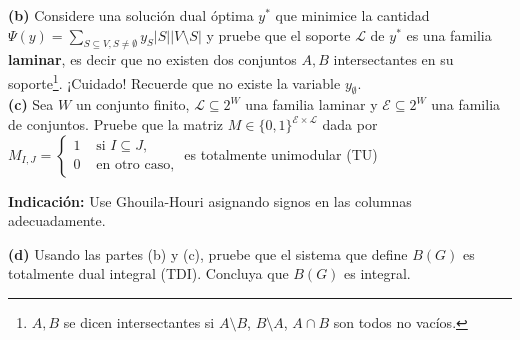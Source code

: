 \documentclass[10pt]{article}
\theoremstyle{plain}
\theoremstyle{definition}
\begin{document}
\hspace{-15pt}\textbf{(b)} Considere una solución dual óptima $y^*$ que minimice la cantidad $\Psi(y)=\sum_{S\subseteq V, S\neq \emptyset} y_S |S||V\setminus S|$
y pruebe que el soporte $\mathcal{L}$ de $y^*$ es una familia \textbf{laminar}, es decir que no existen dos conjuntos $A, B$ intersectantes en su soporte\footnote{$A, B$ se dicen intersectantes si $A\setminus B$, $B\setminus A$, $A\cap B$ son todos no vacíos.}. ¡Cuidado! Recuerde que no existe la variable $y_\emptyset$.\\

\hspace{-15pt}\textbf{(c)} Sea $W$ un conjunto finito, $\mathcal{L}\subseteq 2^W$ una familia laminar y $\mathcal{E}\subseteq 2^W$ una familia de conjuntos. Pruebe que la matriz $M\in \{0,1\}^{\mathcal{E}\times \mathcal{L}}$ dada por
$M_{I,J}=\begin{cases} 1 & \text{ si } I \subseteq J,\\ 0 &\text{ en otro caso,}\end{cases}$ es totalmente unimodular (TU)

\textbf{Indicación:} Use Ghouila-Houri asignando signos en las columnas adecuadamente.

\hspace{-15pt}\textbf{(d)} Usando las partes (b) y (c), pruebe que el sistema que define $B(G)$ es totalmente dual integral (TDI). Concluya que $B(G)$ es integral.
\end{document}
